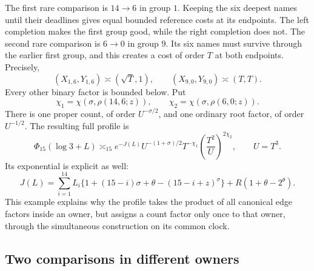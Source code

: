 The first rare comparison is \(14\to6\) in group \(1\).  Keeping the
six deepest names until their deadlines gives equal bounded reference
costs at its endpoints.  The left completion makes the first group good,
while the right completion does not.  The second rare comparison is
\(6\to0\) in group \(9\).  Its six names must survive through the
earlier first group, and this creates a cost of order \(T\) at both
endpoints.  Precisely,
\begin{equation}
 (X_{1,6},Y_{1,6})\asymp(\sqrt T,1),\qquad
 (X_{9,0},Y_{9,0})\asymp(T,T).
 \label{ex:same-endpoints}
\end{equation}
Every other binary factor is bounded below.  Put
\[
 \chi_1=\chi(\sigma,\rho(14,6;z)),\qquad
 \chi_2=\chi(\sigma,\rho(6,0;z)).
\]
There is one proper count, of order \(U^{-\sigma/2}\), and one ordinary
root factor, of order \(U^{-1/2}\).  The resulting full profile is
\begin{equation}
 \Phi_{15}(\log3+L)\asymp_{15}
 e^{-J(L)}U^{-(1+\sigma)/2}T^{-\chi_1}
                   \left(\frac{T^2}{U}\right)^{2\chi_2},
 \qquad U=T^3.
 \label{ex:same-answer}
\end{equation}
Its exponential is explicit as well:
\begin{equation}
 J(L)=\sum_{i=1}^{14}L_i
  \{1+(15-i)\sigma+\theta-(15-i+z)^\sigma\}
       +R(1+\theta-2^\theta).
 \label{ex:same-rate}
\end{equation}
This example explains why the profile takes the product of all canonical
edge factors inside an owner, but assigns a count factor only once to
that owner, through the simultaneous construction on its common clock.

\subsection{Two comparisons in different owners}


